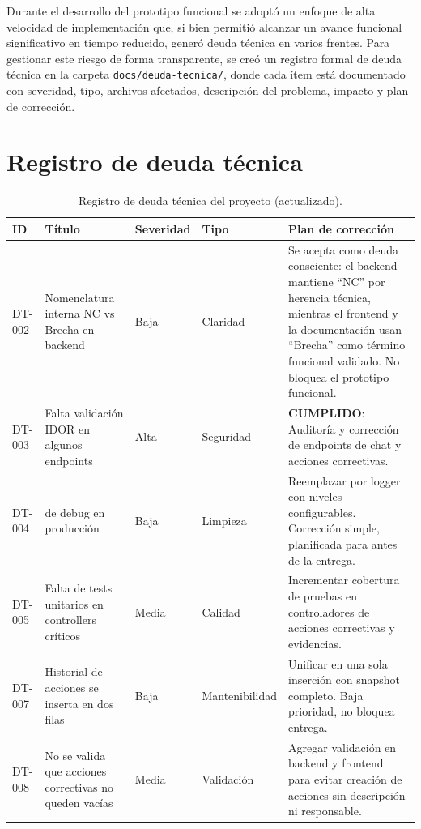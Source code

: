 \documentclass[final]{udpthesis}
\begin{document}
Durante el desarrollo del prototipo funcional se adoptó un enfoque de alta velocidad de implementación que, si bien permitió alcanzar un avance funcional significativo en tiempo reducido, generó deuda técnica en varios frentes. Para gestionar este riesgo de forma transparente, se creó un registro formal de deuda técnica en la carpeta \texttt{docs/deuda-tecnica/}, donde cada ítem está documentado con severidad, tipo, archivos afectados, descripción del problema, impacto y plan de corrección.

\section{Registro de deuda técnica}

\begin{table}[H]
\centering
\scriptsize
\begin{tabularx}{\textwidth}{|L{0.8cm}|Y|L{1.55cm}|L{2.25cm}|Y|}
\hline
{}\textbf{ID} & \textbf{Título} & \textbf{Severidad} & \textbf{Tipo} & \textbf{Plan de corrección} \\ \hline
DT-002 & Nomenclatura interna NC vs Brecha en backend & Baja & Claridad & Se acepta como deuda consciente: el backend mantiene ``NC'' por herencia técnica, mientras el frontend y la documentación usan ``Brecha'' como término funcional validado. No bloquea el prototipo funcional. \\ \hline
DT-003 & Falta validación IDOR en algunos endpoints & Alta & Seguridad & \textbf{CUMPLIDO}: Auditoría y corrección de endpoints de chat y acciones correctivas. \\ \hline
DT-004 &  de debug en producción & Baja & Limpieza & Reemplazar por logger con niveles configurables. Corrección simple, planificada para antes de la entrega. \\ \hline
DT-005 & Falta de tests unitarios en controllers críticos & Media & Calidad & Incrementar cobertura de pruebas en controladores de acciones correctivas y evidencias. \\ \hline
DT-007 & Historial de acciones se inserta en dos filas & Baja & Mantenibilidad & Unificar en una sola inserción con snapshot completo. Baja prioridad, no bloquea entrega. \\ \hline
DT-008 & No se valida que acciones correctivas no queden vacías & Media & Validación & Agregar validación en backend y frontend para evitar creación de acciones sin descripción ni responsable. \\ \hline
\end{tabularx}
\normalsize
\caption{Registro de deuda técnica del proyecto (actualizado).}
\label{tab:deuda-tecnica}
\end{table}
\end{document}

